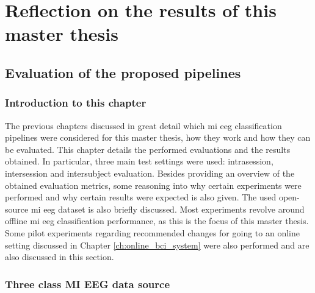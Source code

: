 


\part{Reflection on the results of this master thesis}
\label{part:reflection}

\chapter{Evaluation of the proposed pipelines}
\label{ch:evaluation}

\section{Introduction to this chapter}
\label{sec:evaluation_introduction}

The previous chapters discussed in great detail which \gls{mi} \gls{eeg} classification pipelines were considered for this master thesis, how they work and how they can be evaluated.
This chapter details the performed evaluations and the results obtained.
In particular, three main test settings were used: intrasession, intersession and intersubject evaluation.
Besides providing an overview of the obtained evaluation metrics, some reasoning into why certain experiments were performed and why certain results were expected is also given.
The used open-source \gls{mi} \gls{eeg} dataset is also briefly discussed.
Most experiments revolve around offline \gls{mi} \gls{eeg} classification performance, as this is the focus of this master thesis.
Some pilot experiments regarding recommended changes for going to an online setting discussed in Chapter \ref{ch:online_bci_system} were also performed and are also discussed in this section.

\section{Three class MI EEG data source}
\label{sec:evaluation_data_source}

